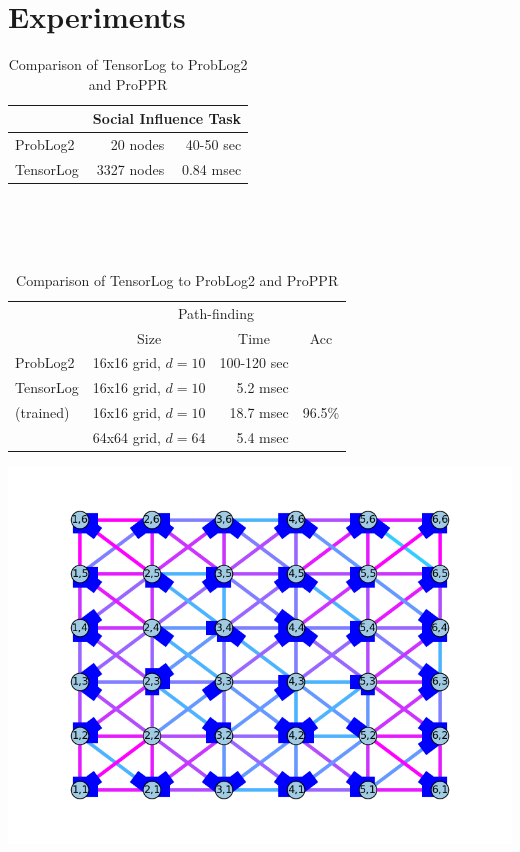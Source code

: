\documentclass{article}
\begin{document}
\section{Experiments}

\begin{table}
\caption{\small Comparison of TensorLog to ProbLog2 and ProPPR} \label{tab:results}
\begin{center}
\begin{tabular}{l|rr}
\hline
          & \multicolumn{2}{c}{Social Influence Task} \\
\hline
ProbLog2  &   20 nodes & 40-50 sec \\
TensorLog & 3327 nodes & 0.84 msec \\
\hline
\end{tabular}\\
~\\
~\\
\begin{tabular}[c]{l|rrr}
\hline
          & \multicolumn{3}{c}{Path-finding} \\
          & \multicolumn{1}{c}{Size} & \multicolumn{1}{c}{Time} & \multicolumn{1}{c}{Acc} \\
\hline
ProbLog2  & 16x16 grid, $d=10$ & 100-120 sec & \\
TensorLog & 16x16 grid, $d=10$ & 5.2 msec  &    \\
(trained) & 16x16 grid, $d=10$ & 18.7 msec  &   96.5\% \\
          & 64x64 grid, $d=64$ & 5.4 msec  &    \\
\hline
\end{tabular}\begin{minipage}[c]{0.3\linewidth}
\includegraphics[width=\linewidth]{./visualize-6x6.png}

\end{minipage}
\end{center}
\end{table}
\end{document}
